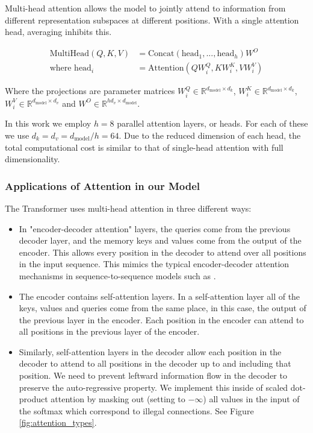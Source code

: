 \documentclass[12pt, a4paper]{article}
\begin{document}
Multi-head attention allows the model to jointly attend to information from different representation subspaces at different positions. With a single attention head, averaging inhibits this.

\begin{align*}
\text{MultiHead}( Q, K, V ) &= \text{Concat}(\text{head}_1,..., \text{head}_h ) W^O \\
\text{where head}_i &= \text{Attention}( QW^Q_i, KW^K_i, V W^V_i )
\end{align*}

Where the projections are parameter matrices $W^Q_i \in \mathbb{R}^{d_{\text{model}} \times d_k}$, $W^K_i \in \mathbb{R}^{d_{\text{model}} \times d_k}$, $W^V_i \in \mathbb{R}^{d_{\text{model}} \times d_v}$ and $W^O \in \mathbb{R}^{hd_v \times d_{\text{model}}}$.

In this work we employ $h = 8$ parallel attention layers, or heads. For each of these we use $d_k = d_v = d_{\text{model}}/h = 64$. Due to the reduced dimension of each head, the total computational cost is similar to that of single-head attention with full dimensionality.

\subsubsection{Applications of Attention in our Model}

The Transformer uses multi-head attention in three different ways:
\begin{itemize}
    \item In "encoder-decoder attention" layers, the queries come from the previous decoder layer, and the memory keys and values come from the output of the encoder. This allows every position in the decoder to attend over all positions in the input sequence. This mimics the typical encoder-decoder attention mechanisms in sequence-to-sequence models such as \cite{38, 2, 9}.
    \item The encoder contains self-attention layers. In a self-attention layer all of the keys, values and queries come from the same place, in this case, the output of the previous layer in the encoder. Each position in the encoder can attend to all positions in the previous layer of the encoder.
    \item Similarly, self-attention layers in the decoder allow each position in the decoder to attend to all positions in the decoder up to and including that position. We need to prevent leftward information flow in the decoder to preserve the auto-regressive property. We implement this inside of scaled dot-product attention by masking out (setting to $-\infty$) all values in the input of the softmax which correspond to illegal connections. See Figure \ref{fig:attention_types}.
\end{itemize}
\end{document}
